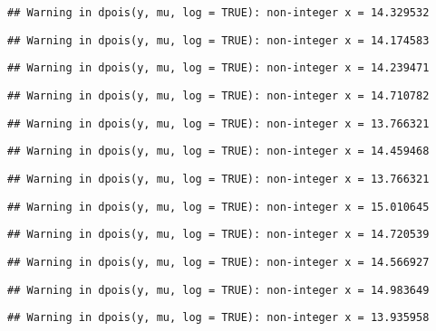 \documentclass[
]{article}
\begin{document}
\begin{verbatim}
## Warning in dpois(y, mu, log = TRUE): non-integer x = 14.329532
\end{verbatim}

\begin{verbatim}
## Warning in dpois(y, mu, log = TRUE): non-integer x = 14.174583
\end{verbatim}

\begin{verbatim}
## Warning in dpois(y, mu, log = TRUE): non-integer x = 14.239471
\end{verbatim}

\begin{verbatim}
## Warning in dpois(y, mu, log = TRUE): non-integer x = 14.710782
\end{verbatim}

\begin{verbatim}
## Warning in dpois(y, mu, log = TRUE): non-integer x = 13.766321
\end{verbatim}

\begin{verbatim}
## Warning in dpois(y, mu, log = TRUE): non-integer x = 14.459468
\end{verbatim}

\begin{verbatim}
## Warning in dpois(y, mu, log = TRUE): non-integer x = 13.766321
\end{verbatim}

\begin{verbatim}
## Warning in dpois(y, mu, log = TRUE): non-integer x = 15.010645
\end{verbatim}

\begin{verbatim}
## Warning in dpois(y, mu, log = TRUE): non-integer x = 14.720539
\end{verbatim}

\begin{verbatim}
## Warning in dpois(y, mu, log = TRUE): non-integer x = 14.566927
\end{verbatim}

\begin{verbatim}
## Warning in dpois(y, mu, log = TRUE): non-integer x = 14.983649
\end{verbatim}

\begin{verbatim}
## Warning in dpois(y, mu, log = TRUE): non-integer x = 13.935958
\end{verbatim}
\end{document}
